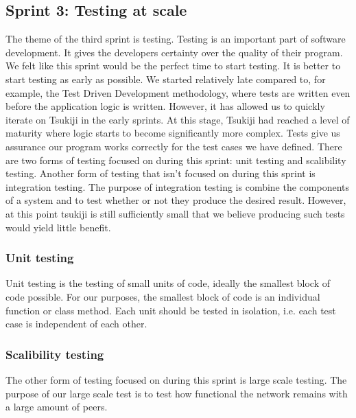 \subsection{Sprint 3: Testing at scale}
The theme of the third sprint is testing.
Testing is an important part of software development.
It gives the developers certainty over the quality of their program.
We felt like this sprint would be the perfect time to start testing.
It is better to start testing as early as possible.
We started relatively late compared to, for example, the Test Driven Development methodology, where tests are written even before the application logic is written.
However, it has allowed us to quickly iterate on Tsukiji in the early sprints.
At this stage, Tsukiji had reached a level of maturity where logic starts to become significantly more complex.
Tests give us assurance our program works correctly for the test cases we have defined.
There are two forms of testing focused on during this sprint: unit testing and scalibility testing.
Another form of testing that isn't focused on during this sprint is integration testing.
The purpose of integration testing is combine the components of a system and to test whether or not they produce the desired result.
However, at this point tsukiji is still sufficiently small that we believe producing such tests would yield little benefit.

\subsubsection{Unit testing}
Unit testing is the testing of small units of code, ideally the smallest block of code possible.
For our purposes, the smallest block of code is an individual function or class method.
Each unit should be tested in isolation, i.e. each test case is independent of each other.

\subsubsection{Scalibility testing}
The other form of testing focused on during this sprint is large scale testing.
The purpose of our large scale test is to test how functional the network remains with a large amount of peers.